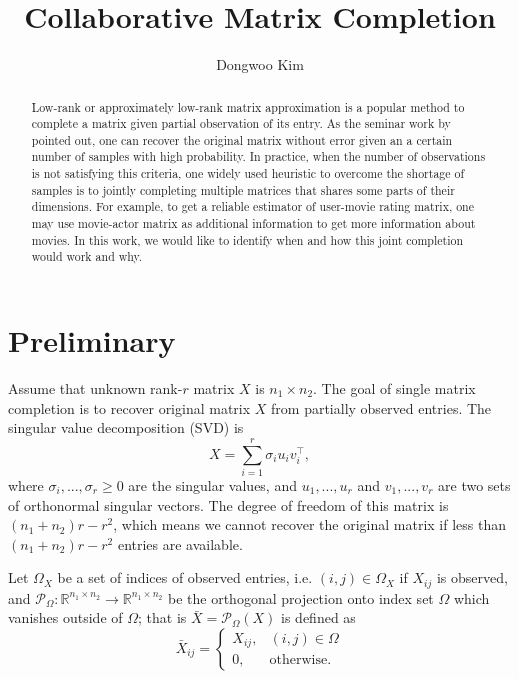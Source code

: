 \documentclass{article} %
\title{Collaborative Matrix Completion}
\author{
Dongwoo Kim
}
\theoremstyle{definition}
\newcommand\mc{\mathcal} %
\begin{document}
\maketitle

\begin{abstract}
Low-rank or approximately low-rank matrix approximation is a popular method to complete a matrix given partial observation of its entry. As the seminar work by \cite{candes2009exact} pointed out, one can recover the original matrix without error given an a certain number of samples with high probability. In practice, when the number of observations is not satisfying this criteria, one widely used heuristic to overcome the shortage of samples is to jointly completing multiple matrices that shares some parts of their dimensions. For example, to get a reliable estimator of user-movie rating matrix, one may use movie-actor matrix as additional information to get more information about movies. In this work, we would like to identify when and how this joint completion would work and why.
\end{abstract}

\section{Preliminary}
Assume that unknown rank-$r$ matrix $X$ is $n_1 \times n_2$. The goal of single matrix completion is to recover original matrix $X$ from partially observed entries. The singular value decomposition (SVD) is
\begin{equation}
X = \sum_{i=1}^{r}\sigma_i u_i v_i^\top,
\end{equation}
where $\sigma_i,...,\sigma_r \geq 0$ are the singular values, and $u_1,...,u_r$ and $v_1,...,v_r$ are two sets of orthonormal singular vectors. The degree of freedom of this matrix is $(n_1+n_2)r - r^2$, which means we cannot recover the original matrix if less than $(n_1+n_2)r - r^2$ entries are available.  

Let $\Omega_X$ be a set of indices of observed entries, i.e. $(i,j) \in \Omega_X$ if $X_{ij}$ is observed, and $\mc{P}_{\Omega}: \mathbb{R}^{n_1\times n_2} \rightarrow \mathbb{R}^{n_1\times n_2}$ be the orthogonal projection onto index set $\Omega$ which vanishes outside of $\Omega$; that is $\bar{X} = \mc{P}_{\Omega}(X)$ is defined as
\begin{equation}
\bar{X}_{ij} = \left\{
  \begin{array}{lr}
    X_{ij}, & (i,j) \in \Omega\\
    0, & \text{otherwise}.
  \end{array}
\right.
\end{equation}
\end{document}
